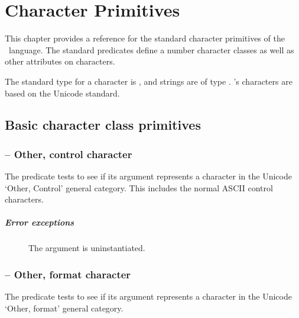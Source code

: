 \chapter{Character Primitives}
\label{chars}

This chapter provides a reference for the standard character primitives of the \go\ language. The standard predicates define a number character classes as well as other attributes on characters.

The standard type for a character is , and strings are of type . \go's characters are based on the Unicode standard.

\section{Basic character class primitives}
\label{chars:charclass}

\subsection{ -- Other, control character}
\label{chars:isCcChar}

The  predicate tests to see if its  argument represents a character in the Unicode `Other, Control' general category. This includes the normal ASCII control characters.
        
\paragraph{Error exceptions}
\begin{description}
\item[]
The argument is uninstantiated.
\end{description}

\subsection{ -- Other, format character}
\label{chars:isCfChar}

The  predicate tests to see if its  argument represents a character in the Unicode `Other, format' general category. 
        
